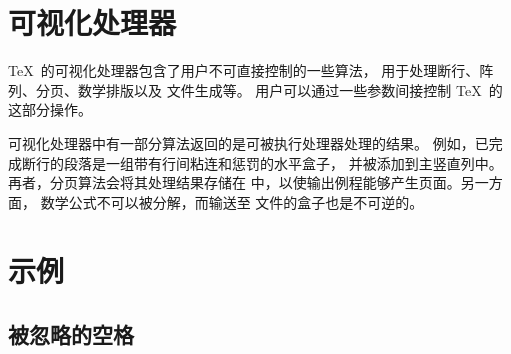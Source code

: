 \documentclass{book}
\begin{document}
\section{可视化处理器}

\TeX\ 的可视化处理器包含了用户不可直接控制的一些算法，
用于处理断行、阵列、分页、数学排版以及  文件生成等。
用户可以通过一些参数间接控制 \TeX\ 的这部分操作。

可视化处理器中有一部分算法返回的是可被执行处理器处理的结果。
例如，已完成断行的段落是一组带有行间粘连和惩罚的水平盒子，
并被添加到主竖直列中。再者，分页算法会将其处理结果存储在
 中，以使输出例程能够产生页面。另一方面，
数学公式不可以被分解，而输送至  文件的盒子也是不可逆的。

\section{示例}

\subsection{被忽略的空格}
\end{document}
